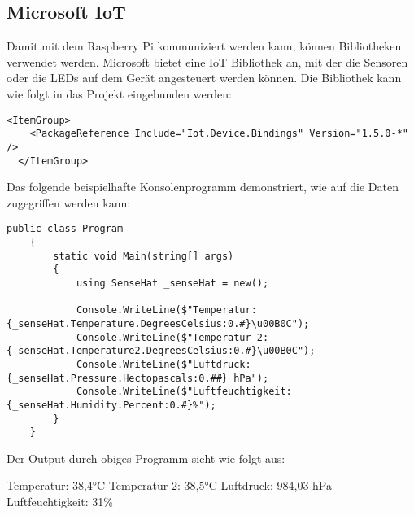 \subsection{Microsoft IoT}
\label{subsec:MicrosoftIot}
Damit mit dem Raspberry Pi kommuniziert werden kann, können Bibliotheken verwendet werden.
Microsoft bietet eine IoT Bibliothek an, mit der die Sensoren oder die LEDs auf
dem Gerät angesteuert werden können. Die Bibliothek kann wie folgt in das Projekt eingebunden
werden:

\begin{lstlisting}[language={[Sharp]C}, caption=IoT NuGet Package,
    label=lst:IotNugetPackage]
    <ItemGroup>
    <PackageReference Include="Iot.Device.Bindings" Version="1.5.0-*" />
  </ItemGroup>
\end{lstlisting}

Das folgende beispielhafte Konsolenprogramm demonstriert, wie auf die Daten zugegriffen werden kann:

\begin{lstlisting}[language={[Sharp]C}, caption=SenseHat Beispielprogramm,
    label=lst:SenseHatBeispielProgramm]
    public class Program
    {
        static void Main(string[] args)
        {
            using SenseHat _senseHat = new();

            Console.WriteLine($"Temperatur: {_senseHat.Temperature.DegreesCelsius:0.#}\u00B0C");
            Console.WriteLine($"Temperatur 2: {_senseHat.Temperature2.DegreesCelsius:0.#}\u00B0C");
            Console.WriteLine($"Luftdruck: {_senseHat.Pressure.Hectopascals:0.##} hPa");
            Console.WriteLine($"Luftfeuchtigkeit: {_senseHat.Humidity.Percent:0.#}%");
        }
    }
\end{lstlisting}

Der Output durch obiges Programm sieht wie folgt aus:

\begin{zitat}
    Temperatur: 38,4°C
    \newline
    Temperatur 2: 38,5°C
    \newline
    Luftdruck: 984,03 hPa
    \newline
    Luftfeuchtigkeit: 31\%
\end{zitat}